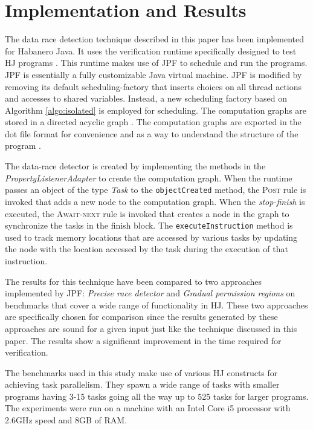 \section{Implementation and Results}
\label{sec:res}

The data race detection technique described in this paper has been implemented for Habanero Java. It uses the verification runtime specifically designed to test HJ programs \cite{anderson2014jpf}. This runtime makes use of JPF to schedule and run the programs. JPF is essentially a fully customizable Java virtual machine. JPF is modified by removing its default scheduling-factory that inserts choices on all thread actions and accesses to shared variables. Instead, a new scheduling factory based on Algorithm \ref{algo:isolated} is employed for scheduling. The computation graphs are stored in a directed acyclic graph \cite{jgrapht}. The computation graphs are exported in the dot file format for convenience and as a way to understand the structure of the program \cite{graphviz}.

The data-race detector is created by implementing the methods in the \textit{PropertyListenerAdapter} to create the computation graph. When the runtime passes an object of the type \textit{Task} to the \texttt{objectCreated} method, the \textsc{Post} rule is invoked that adds a new node to the computation graph. When the \textit{stop-finish} is executed, the \textsc{Await-next} rule is invoked that creates a node in the graph to synchronize the tasks in the finish block. The \texttt{executeInstruction} method is used to track memory locations that are accessed by various tasks by updating the node with the location accessed by the task during the execution of that instruction.

The results for this technique have been compared to two approaches implemented by JPF: \textit{Precise race detector} and \textit{Gradual permission regions} on benchmarks that cover a wide range of functionality in HJ. These two approaches are specifically chosen for comparison since the results generated by these approaches are sound for a given input just like the technique discussed in this paper. The results show a significant improvement in the time required for verification. 

The benchmarks used in this study make use of various HJ constructs for achieving task parallelism. They spawn a wide range of tasks with smaller programs having 3-15 tasks going all the way up to 525 tasks for larger programs. The experiments were run on a machine with an Intel Core i5 processor with 2.6GHz speed and 8GB of RAM.

